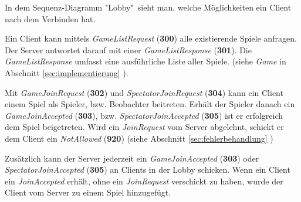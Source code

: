 \documentclass[a4paper, 10pt]{article}
\begin{document}
In dem Sequenz-Diagramm "Lobby"\ sieht man, welche Möglichkeiten ein Client nach dem Verbinden hat.\par
Ein Client kann mittels \textit{GameListRequest} (\textbf{300}) alle existierende Spiele anfragen. Der Server antwortet darauf mit einer \textit{GameListResponse} (\textbf{301}). Die \textit{GameListResponse} umfasst eine ausführliche Liste aller Spiele. (siehe \textit{Game} in Abschnitt \ref{sec:implementierung} ).\par
Mit \textit{GameJoinRequest} (\textbf{302}) und \textit{SpectatorJoinRequest} (\textbf{304}) kann ein Client einem Spiel als Spieler, bzw. Beobachter beitreten. Erhält der Spieler danach ein \textit{GameJoinAccepted} (\textbf{303}), bzw. \textit{SpectatorJoinAccepted} (\textbf{305}) ist er erfolgreich dem Spiel beigetreten. Wird ein \textit{JoinRequest} vom Server abgelehnt, schickt er dem Client ein \textit{NotAllowed} (\textbf{920}) (siehe Abschnitt \ref{sec:fehlerbehandlung} )\par
Zusätzlich kann der Server jederzeit ein \textit{GameJoinAccepted} (\textbf{303}) oder \textit{SpectatorJoinAccepted} (\textbf{305}) an Clients in der Lobby schicken. Wenn ein Client ein \textit{JoinAccepted} erhält, ohne ein \textit{JoinRequest} verschickt zu haben, wurde der Client vom Server zu einem Spiel hinzugefügt.\par
\end{document}
